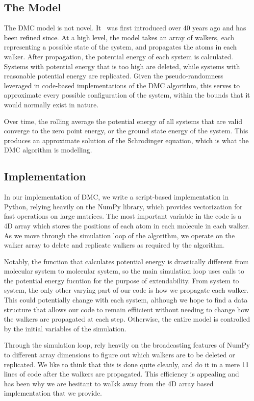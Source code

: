 \documentclass[journal=jacsat,manuscript=article]{achemso}
\begin{document}
\subsection{The Model}
The DMC model is not novel. It~\cite{Anderson1975} was first introduced over 40 years ago and has been refined since. At a high level, the model takes an array of walkers, each representing a possible state of the system, and propagates the atoms in each walker. After propagation, the potential energy of each system is calculated. Systems with potential energy that is too high are deleted, while systems with reasonable potential energy are replicated. Given the pseudo-randomness leveraged in code-based implementations of the DMC algorithm, this serves to approximate every possible configuration of the system, within the bounds that it would normally exist in nature.

Over time, the rolling average the potential energy of all systems that are valid converge to the zero point energy, or the ground state energy of the system. This produces an approximate solution of the Schrodinger equation, which is what the DMC algorithm is modelling. 
\subsection{Implementation}
In our implementation of DMC, we write a script-based implementation in Python, relying heavily on the NumPy library, which provides vectorization for fast operations on large matrices. The most important variable in the code is a 4D array which stores the positions of each atom in each molecule in each walker. As we move through the simulation loop of the algorithm, we operate on the walker array to delete and replicate walkers as required by the algorithm.

Notably, the function that calculates potential energy is drastically different from molecular system to molecular system, so the main simulation loop uses calls to the potential energy fucntion for the purpose of extendability. From system to system, the only other varying part of our code is how we propagate each walker. This could potentially change with each system, although we hope to find a data structure that allows our code to remain effiicient without needing to change how the walkers are propagated at each step. Otherwise, the entire model is controlled by the initial variables of the simulation.

Through the simulation loop, rely heavily on the broadcasting features of NumPy to different array dimensions to figure out which walkers are to be deleted or replicated. We like to think that this is done quite cleanly, and do it in a mere 11 lines of code after the walkers are propagated. This efficiency is appealing and has been why we are hesitant to walkk away from the 4D array based implementation that we provide. 
\end{document}
